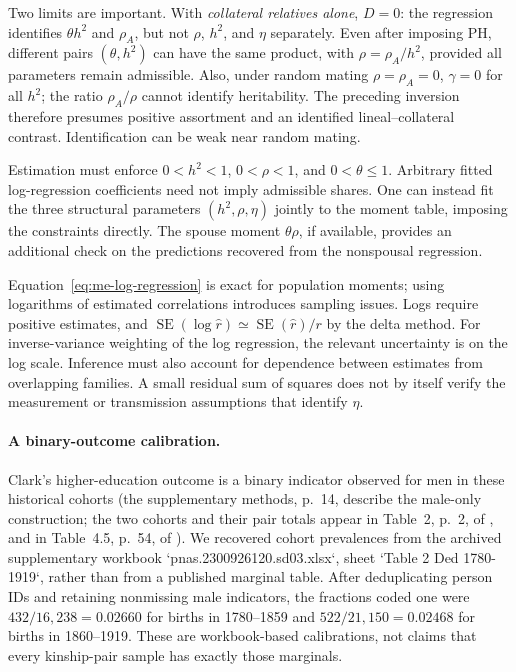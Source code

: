 Two limits are important. With \emph{collateral relatives alone}, $D=0$:
the regression identifies $\theta h^2$ and $\rho_A$, but not $\rho$,
$h^2$, and $\eta$ separately. Even after imposing PH, different pairs
$(\theta,h^2)$ can have the same product, with
$\rho=\rho_A/h^2$, provided all parameters remain admissible.
Also, under random mating $\rho=\rho_A=0$, $\gamma=0$ for all $h^2$;
the ratio $\rho_A/\rho$ cannot identify heritability. The preceding
inversion therefore presumes positive assortment and an identified
lineal--collateral contrast. Identification can be weak near random
mating.

Estimation must enforce $0<h^2<1$, $0<\rho<1$, and
$0<\theta\leq1$. Arbitrary fitted log-regression coefficients need
not imply admissible shares. One can instead fit the three structural
parameters $(h^2,\rho,\eta)$ jointly to the moment table, imposing
the constraints directly. The spouse moment $\theta\rho$, if available,
provides an additional check on the predictions recovered from the
nonspousal regression.

Equation~\eqref{eq:me-log-regression} is exact for population moments;
using logarithms of estimated correlations introduces sampling issues.
Logs require positive estimates, and
$\operatorname{SE}(\log\widehat r)\simeq
\operatorname{SE}(\widehat r)/r$ by the delta method. For inverse-variance weighting of the log regression, the relevant
uncertainty is on the log scale. Inference must also account for
dependence between estimates from overlapping families. A small
residual sum of squares does not by itself verify the measurement or
transmission assumptions that identify $\eta$.
\paragraph{A binary-outcome calibration.}\mbox{}\par
Clark's higher-education outcome is a binary indicator observed for men in
these historical cohorts (the supplementary methods, p.~14, describe the
male-only construction; the two cohorts and their pair totals appear in
Table~2, p.~2, of \citet{Clark2023}, and in Table~4.5, p.~54, of
\citet{Clark2026}). We recovered cohort prevalences from the archived
supplementary workbook `pnas.2300926120.sd03.xlsx`, sheet `Table 2 Ded
1780-1919`, rather than from a published marginal table. After deduplicating
person IDs and retaining nonmissing male indicators, the fractions coded one
were $432/16{,}238=0.02660$ for births in 1780--1859 and
$522/21{,}150=0.02468$ for births in 1860--1919. These are workbook-based
calibrations, not claims that every kinship-pair sample has exactly those
marginals.

